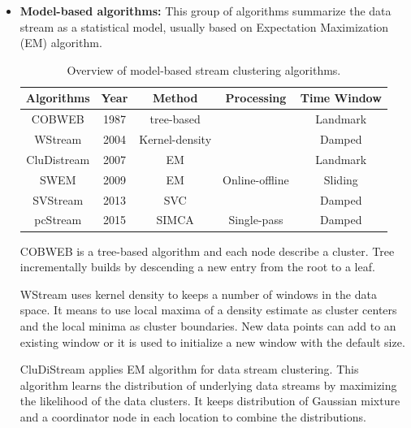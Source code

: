 \documentclass[../UNBThesis2.tex]{subfiles}
\begin{document}
\begin{itemize}
\item\textbf{Model-based algorithms:}
This group of algorithms summarize the data stream as a statistical model, usually based on Expectation Maximization (EM) algorithm. 

\begin{table}[h]
    \centering
    \caption{Overview of model-based stream clustering algorithms. }
    \label{modealgo}
    \small
    \begin{tabular}{c c c c c}
    \hline
      \textbf{Algorithms} & \textbf{Year} & \textbf{ Method } & \textbf{Processing} & \textbf{ Time Window}  \\
     \hline \midrule

      COBWEB             &    1987        &   tree-based          &          & Landmark \\
     \hline
     WStream             &    2004        &   Kernel-density          &                     & Damped \\
      \hline
      CluDistream        &     2007       &   EM      &        &  Landmark \\
    \hline 
      SWEM               &    2009        &  EM         &  Online-offline      & Sliding\\
    \hline 
      SVStream          &    2013        &    SVC       &                     & Damped  \\
    \hline 
      pcStream          &    2015        &       SIMCA      &          Single-pass           & Damped  \\
\bottomrule
    \end{tabular}
\end{table}


COBWEB \cite{fisher1987knowledge} is a tree-based algorithm and each node describe a cluster. Tree incrementally builds by descending a new entry from the root to a leaf. 

WStream \cite{tasoulis2006unsupervised} uses kernel density to keeps a number of windows in the data space. It means to use local maxima of a density estimate as cluster centers and the local minima as cluster boundaries. New data points can add to an existing window or it is used to initialize a new window with the default size. 

CluDiStream \cite{zhou2007distributed} applies EM algorithm for data stream clustering. This algorithm learns the distribution of underlying data streams by maximizing the likelihood of the data clusters. It keeps distribution of Gaussian mixture and a coordinator node in each location to combine the distributions.


\end{itemize}
\end{document}
